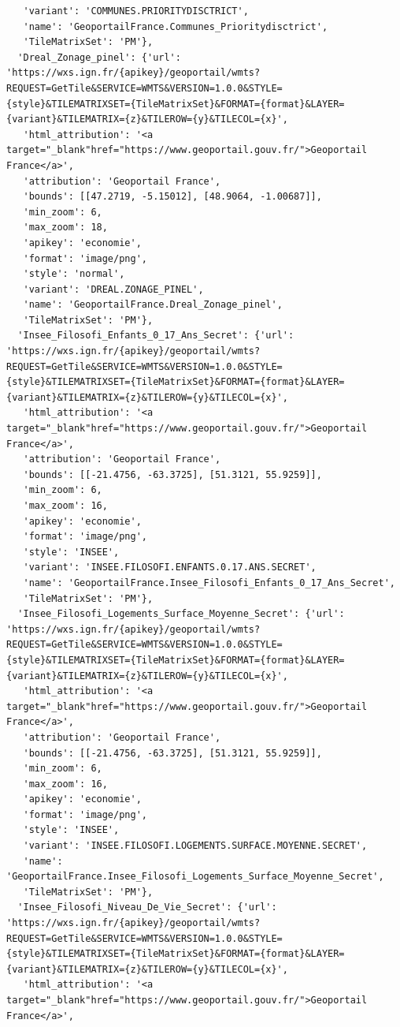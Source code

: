 \documentclass[
  letterpaper,
  DIV=11,
  numbers=noendperiod]{scrreprt}
\begin{document}
\begin{verbatim}
   'variant': 'COMMUNES.PRIORITYDISCTRICT',
   'name': 'GeoportailFrance.Communes_Prioritydisctrict',
   'TileMatrixSet': 'PM'},
  'Dreal_Zonage_pinel': {'url': 'https://wxs.ign.fr/{apikey}/geoportail/wmts?REQUEST=GetTile&SERVICE=WMTS&VERSION=1.0.0&STYLE={style}&TILEMATRIXSET={TileMatrixSet}&FORMAT={format}&LAYER={variant}&TILEMATRIX={z}&TILEROW={y}&TILECOL={x}',
   'html_attribution': '<a target="_blank"href="https://www.geoportail.gouv.fr/">Geoportail France</a>',
   'attribution': 'Geoportail France',
   'bounds': [[47.2719, -5.15012], [48.9064, -1.00687]],
   'min_zoom': 6,
   'max_zoom': 18,
   'apikey': 'economie',
   'format': 'image/png',
   'style': 'normal',
   'variant': 'DREAL.ZONAGE_PINEL',
   'name': 'GeoportailFrance.Dreal_Zonage_pinel',
   'TileMatrixSet': 'PM'},
  'Insee_Filosofi_Enfants_0_17_Ans_Secret': {'url': 'https://wxs.ign.fr/{apikey}/geoportail/wmts?REQUEST=GetTile&SERVICE=WMTS&VERSION=1.0.0&STYLE={style}&TILEMATRIXSET={TileMatrixSet}&FORMAT={format}&LAYER={variant}&TILEMATRIX={z}&TILEROW={y}&TILECOL={x}',
   'html_attribution': '<a target="_blank"href="https://www.geoportail.gouv.fr/">Geoportail France</a>',
   'attribution': 'Geoportail France',
   'bounds': [[-21.4756, -63.3725], [51.3121, 55.9259]],
   'min_zoom': 6,
   'max_zoom': 16,
   'apikey': 'economie',
   'format': 'image/png',
   'style': 'INSEE',
   'variant': 'INSEE.FILOSOFI.ENFANTS.0.17.ANS.SECRET',
   'name': 'GeoportailFrance.Insee_Filosofi_Enfants_0_17_Ans_Secret',
   'TileMatrixSet': 'PM'},
  'Insee_Filosofi_Logements_Surface_Moyenne_Secret': {'url': 'https://wxs.ign.fr/{apikey}/geoportail/wmts?REQUEST=GetTile&SERVICE=WMTS&VERSION=1.0.0&STYLE={style}&TILEMATRIXSET={TileMatrixSet}&FORMAT={format}&LAYER={variant}&TILEMATRIX={z}&TILEROW={y}&TILECOL={x}',
   'html_attribution': '<a target="_blank"href="https://www.geoportail.gouv.fr/">Geoportail France</a>',
   'attribution': 'Geoportail France',
   'bounds': [[-21.4756, -63.3725], [51.3121, 55.9259]],
   'min_zoom': 6,
   'max_zoom': 16,
   'apikey': 'economie',
   'format': 'image/png',
   'style': 'INSEE',
   'variant': 'INSEE.FILOSOFI.LOGEMENTS.SURFACE.MOYENNE.SECRET',
   'name': 'GeoportailFrance.Insee_Filosofi_Logements_Surface_Moyenne_Secret',
   'TileMatrixSet': 'PM'},
  'Insee_Filosofi_Niveau_De_Vie_Secret': {'url': 'https://wxs.ign.fr/{apikey}/geoportail/wmts?REQUEST=GetTile&SERVICE=WMTS&VERSION=1.0.0&STYLE={style}&TILEMATRIXSET={TileMatrixSet}&FORMAT={format}&LAYER={variant}&TILEMATRIX={z}&TILEROW={y}&TILECOL={x}',
   'html_attribution': '<a target="_blank"href="https://www.geoportail.gouv.fr/">Geoportail France</a>',

\end{verbatim}
\end{document}
